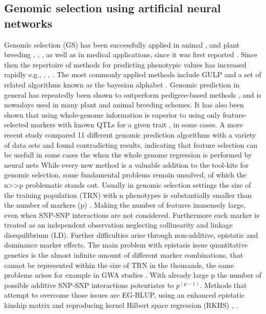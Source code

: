 \subsection{Genomic selection using artificial neural networks }
Genomic selection (GS) has been successfully applied in animal \cite{gianola2015one}, \cite{hayes2010genome}
and plant breeding \cite{crossa2010}, \cite{desta2014genomic}, \cite{heffner2010plant}, \cite{crossa2017genomic}
as well as in medical applications, since it was first reported  \cite{hayes2001}. Since then the repertoire of
methods for predicting phenotypic values has increased rapidly e.g.\cite{dlc2009}, \cite{habier2011}, \cite{gianola2013} ,
\cite{crossa2017}. The most commonly applied methods include GULP and a set of related algorithms known as the bayesian alphabet
\cite{gianola2009}. 
Genomic prediction in general has repeatedly been shown to outperform pedigree-based methods \cite{crossa2010},
\cite{albrecht2011} and is nowadays used in many plant and animal breeding schemes. 
It has also been shown that using whole-genome information is superior to using only feature-selected markers
with known QTLs for a given trait \cite{bernardo2007}, \cite{heffner2011} in some cases. A more recent study
\cite{azodi2019} compared 11 different genomic prediction algorithms with a variety of data sets and found
contradicting results, indicating that feature selection can be usefull in some cases the when the whole
genome regression is performed by neural nets 
While every new method is a valuable addition to the tool-kits for genomic selection, some fundamental
problems remain unsolved, of which the n>>p problematic stands out. Usually in genomic selection settings
the size of the training population (TRN) with n phenotypes is substantially smaller than the number of
markers (p) \cite{fan2014challenges}. Making the number of features immensely large,  even when SNP-SNP
interactions are not considered.  Furthermore each marker is treated as an independent observation
neglecting collinearity and linkage disequilibrium (LD). 
Further difficulties arise through non-additive, epistatic and dominance marker effects. The main problem
with epistasis issue quantitative genetics is the almost infinite amount of different marker combinations,
that cannot be represented within the size of TRN in the thousands, the same problems arises for example
in GWA studies \cite{korte2013advantages}. With already large p the number of possible additive SNP-SNP interactions
potentiates to $p^{(p-1)}$. Methods that attempt to overcome those issues are EG-BLUP, using an enhanced
epistatic kinship matrix and reproducing kernel Hilbert space regression (RKHS) \cite{jiang2015}, \cite{martini2017genomic}.

